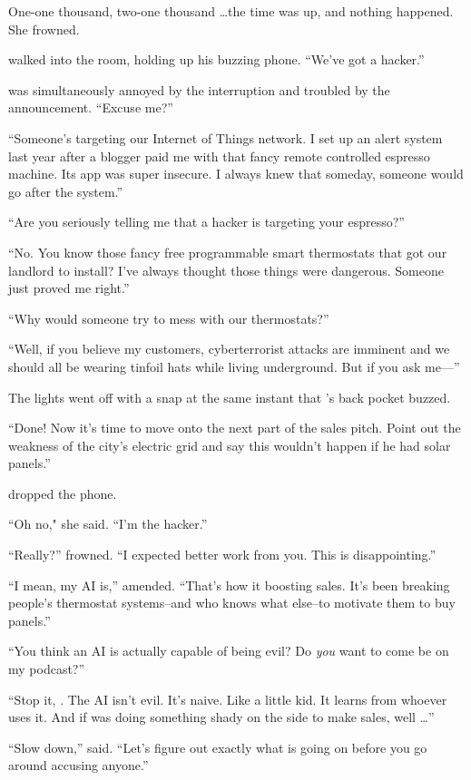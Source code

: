 One-one thousand, two-one thousand \dots the time was up, and nothing happened. She frowned. 

{\sidetag} walked into the room, holding up his buzzing phone. ``We've got a hacker.''

{\protag} was simultaneously annoyed by the interruption and troubled by the announcement. ``Excuse me?''

``Someone's targeting our Internet of Things network. I set up an alert system last year after a blogger paid me with that fancy remote controlled espresso machine. Its app was super insecure. I always knew that someday, someone would go after the system.''

``Are you seriously telling me that a hacker is targeting your espresso?''

``No. You know those fancy free programmable smart thermostats that \crunchyCity{} got our landlord to install? I've always thought those things were dangerous. Someone just proved me right.''

``Why would someone try to mess with our thermostats?''

``Well, if you believe my customers, cyberterrorist attacks are imminent and we should all be wearing tinfoil hats while living underground. But if you ask me---''

The lights went off with a snap at the same instant that {\protag}'s back pocket buzzed.

``Done! Now it's time to move onto the next part of the sales pitch. Point out the weakness of the city's electric grid and say this wouldn't happen if he had solar panels.''

{\protag} dropped the phone.

``Oh no," she said. ``I'm the hacker.''

``Really?'' {\sidetag} frowned. ``I expected better work from you. This is disappointing.''

``I mean, my AI is,'' {\protag} amended. ``That's how it boosting sales. It's been breaking people's thermostat systems--and who knows what else--to motivate them to buy panels.''

``You think an AI is actually capable of being evil? Do \emph{you} want to come be on my podcast?''

``Stop it, {\sidetag}. The AI isn't evil. It's naive. Like a little kid. It learns from whoever uses it. And if {\energyJerk} was doing something shady on the side to make sales, well \dots ''

``Slow down,'' {\sidetag} said. ``Let's figure out exactly what is going on before you go around accusing anyone.''

